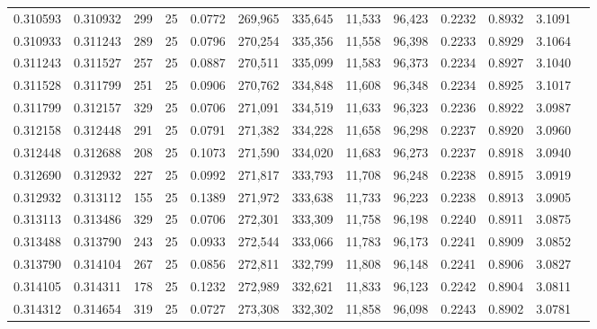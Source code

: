 \begin{tabular}{rrrrrrrrrrrrr}
0.310593 & 0.310932 &   299 &  25 &                                     0.0772 & 269,965 & 335,645 &  11,533 &  96,423 & 0.2232 & 0.8932 & 3.1091 \\
0.310933 & 0.311243 &   289 &  25 &                                     0.0796 & 270,254 & 335,356 &  11,558 &  96,398 & 0.2233 & 0.8929 & 3.1064 \\
0.311243 & 0.311527 &   257 &  25 &                                     0.0887 & 270,511 & 335,099 &  11,583 &  96,373 & 0.2234 & 0.8927 & 3.1040 \\
0.311528 & 0.311799 &   251 &  25 &                                     0.0906 & 270,762 & 334,848 &  11,608 &  96,348 & 0.2234 & 0.8925 & 3.1017 \\
0.311799 & 0.312157 &   329 &  25 &                                     0.0706 & 271,091 & 334,519 &  11,633 &  96,323 & 0.2236 & 0.8922 & 3.0987 \\
0.312158 & 0.312448 &   291 &  25 &                                     0.0791 & 271,382 & 334,228 &  11,658 &  96,298 & 0.2237 & 0.8920 & 3.0960 \\
0.312448 & 0.312688 &   208 &  25 &                                     0.1073 & 271,590 & 334,020 &  11,683 &  96,273 & 0.2237 & 0.8918 & 3.0940 \\
0.312690 & 0.312932 &   227 &  25 &                                     0.0992 & 271,817 & 333,793 &  11,708 &  96,248 & 0.2238 & 0.8915 & 3.0919 \\
0.312932 & 0.313112 &   155 &  25 &                                     0.1389 & 271,972 & 333,638 &  11,733 &  96,223 & 0.2238 & 0.8913 & 3.0905 \\
0.313113 & 0.313486 &   329 &  25 &                                     0.0706 & 272,301 & 333,309 &  11,758 &  96,198 & 0.2240 & 0.8911 & 3.0875 \\
0.313488 & 0.313790 &   243 &  25 &                                     0.0933 & 272,544 & 333,066 &  11,783 &  96,173 & 0.2241 & 0.8909 & 3.0852 \\
0.313790 & 0.314104 &   267 &  25 &                                     0.0856 & 272,811 & 332,799 &  11,808 &  96,148 & 0.2241 & 0.8906 & 3.0827 \\
0.314105 & 0.314311 &   178 &  25 &                                     0.1232 & 272,989 & 332,621 &  11,833 &  96,123 & 0.2242 & 0.8904 & 3.0811 \\
0.314312 & 0.314654 &   319 &  25 &                                     0.0727 & 273,308 & 332,302 &  11,858 &  96,098 & 0.2243 & 0.8902 & 3.0781 \\

\end{tabular}
